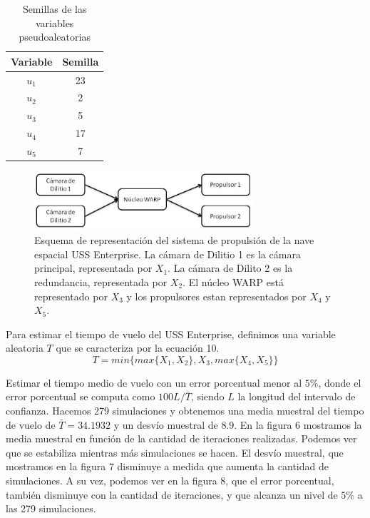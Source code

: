\documentclass[10pt,journal,compsoc]{IEEEtran}
\begin{document}
\begin{table}[!t]
\renewcommand{\arraystretch}{1.3}
\caption{Semillas de las variables pseudoaleatorias}
\centering
\begin{tabular}{c c}
\hline
\hline
Variable  & Semilla\\
\hline
$u_1$ &  23\\
$u_2$ & 2 \\
$u_3$ & 5 \\
$u_4$ & 17  \\
$u_5$ & 7 \\
\hline
\hline
\end{tabular}
\label{tab:sim}
\end{table}






\begin{figure}[t]
\label{fig:3d}
\begin{center}
\centering
\includegraphics[width=3.2in]{propulsor.jpg}
\caption{Esquema de representaci\'on del sistema de propulsi\'on de la nave espacial USS Enterprise.  La c\'amara de Dilitio 1 es la c\'amara principal, representada por $X_1$. La c\'amara de Dilito 2 es la redundancia, representada por $X_2$. El n\'ucleo WARP est\'a representado
 por $X_3$ y los propulsores estan representados por $X_4$ y $X_5$.}
\end{center}
\end{figure}

Para estimar el tiempo de vuelo del USS Enterprise, definimos una variable aleatoria $T$ que se caracteriza por la ecuaci\'on 10.
\begin{equation}
T = min\{ max\{X_1, X_2\}, X_3, max\{X_4, X_5\} \}
\end{equation}


\indent Estimar el tiempo medio de vuelo con un error porcentual menor al $5\%$, donde el error porcentual se computa
como $100L/\bar{T}$, siendo $L$ la longitud del intervalo de confianza.  Hacemos 279 simulaciones y obtenemos una
media muestral del tiempo de vuelo de $\bar{T}=34.1932$ y un desv\'io muestral de $8.9$.
En la figura 6 mostramos la media muestral en funci\'on de la cantidad de iteraciones realizadas.  Podemos ver que se 
estabiliza mientras m\'as simulaciones se hacen. El desv\'io muestral, que
mostramos en la figura 7 disminuye a medida que aumenta la cantidad de simulaciones.  A su vez, podemos ver en la figura 8,
que el error porcentual, tambi\'en disminuye con la cantidad de iteraciones, y que alcanza un nivel de $5\%$ a las 279 simulaciones.
\end{document}
